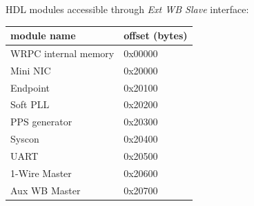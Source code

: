 HDL modules accessible through \emph{Ext WB Slave} interface:
\begin{center}
  \begin{tabular}{|l|l|}
    \hline {\bf module name} & {\bf offset (bytes)}\\
    \hline
    WRPC internal memory & 0x00000\\
                Mini NIC & 0x20000\\
                Endpoint & 0x20100\\
                Soft PLL & 0x20200\\
           PPS generator & 0x20300\\
                  Syscon & 0x20400\\
                    UART & 0x20500\\
           1-Wire Master & 0x20600\\
           Aux WB Master & 0x20700\\
    \hline
  \end{tabular}
\end{center}
